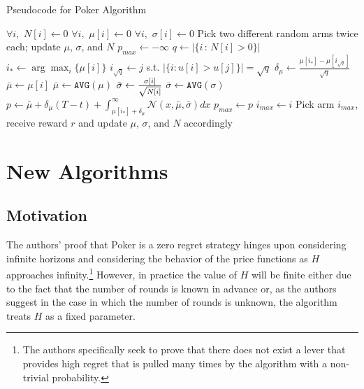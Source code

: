 \documentclass[12pt]{article}
\begin{document}
\begin{algorithm}
\scriptsize
  \caption{Pseudocode for Poker Algorithm}
  \begin{algorithmic}
  \State $\forall i, \, \, N[i] \gets 0$ 
  \State $\forall i, \, \, \mu[i] \gets 0$ 
  \State $\forall i, \, \, \sigma[i] \gets 0$ 
  \State
  \State Pick two different random arms twice each; update $\mu$, $\sigma$, and $N$
    	\State $p_{max} \gets -\infty$
        \State $q \gets |\{i \, : \, N[i] > 0\}|$
        \State $i_{*} \gets \arg \max_{i} \{\mu[i]\}$
        \State $i_{\sqrt{q}} \gets j$ s.t. $|\{i : u[i] > u[j]\}| = \sqrt{q}$
        \State $\delta_{\mu} \gets \frac{\mu[i_{*}] - \mu[i_{\sqrt{q}}]}{\sqrt{q}}$ 
               \State $\bar{\mu} \gets \mu[i]$ 
            \Else 
                \State $\bar{\mu} \gets \texttt{AVG}(\mu)$ 
            \EndIf
                    \State $\bar{\sigma} \gets {\sigma[i] \over{\sqrt{N[i]}}}$
            \Else
               \State $\bar{\sigma} \gets \texttt{AVG}(\sigma)$ 
            \EndIf
        \State $p \gets \bar{\mu} + \delta_{\mu}(T - t) + \int_{\mu[i_*] + \delta_{\mu}}^{\infty} \mathcal{N}\left(x, \bar{\mu}, \bar{\sigma} \right) dx$
            \State$p_{max} \gets p$
            \State $i_{max} \gets i$ 
        \EndIf
        \EndFor
        \State Pick arm $i_{max}$, receive reward $r$ and update $\mu$, $\sigma$, and $N$ accordingly
    \EndFor
  \end{algorithmic}
\end{algorithm}


\section{New Algorithms}

\subsection{Motivation}

The authors' proof that Poker is a zero regret strategy hinges upon considering infinite horizons and considering the behavior of the price functions as $H$ approaches infinity.\footnote{The authors specifically seek to prove that there does not exist a lever that provides high regret that is pulled many times by the algorithm with a non-trivial probability.} However, in practice the value of $H$ will be finite either due to the fact that the number of rounds is known in advance or, as the authors suggest in the case in which the number of rounds is unknown, the algorithm treats $H$ as a fixed parameter.
\end{document}
